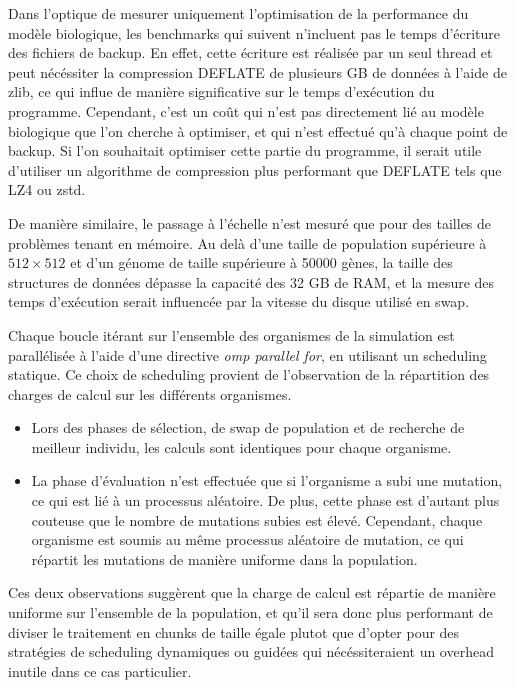 \documentclass[a4paper, 10pt, twoside]{article}
\begin{document}
Dans l'optique de mesurer uniquement l'optimisation de la performance du modèle biologique, les benchmarks qui suivent n'incluent pas le temps d'écriture des fichiers de backup. En effet, cette écriture est réalisée par un seul thread et peut nécéssiter la compression DEFLATE de plusieurs GB de données à l'aide de zlib, ce qui influe de manière significative sur le temps d'exécution du programme. Cependant, c'est un coût qui n'est pas directement lié au modèle biologique que l'on cherche à optimiser, et qui n'est effectué qu'à chaque point de backup. Si l'on souhaitait optimiser cette partie du programme, il serait utile d'utiliser un algorithme de compression plus performant que DEFLATE tels que LZ4 ou zstd.

De manière similaire, le passage à l'échelle n'est mesuré que pour des tailles de problèmes tenant en mémoire. Au delà d'une taille de population supérieure à $512 \times 512$ et d'un génome de taille supérieure à 50000 gènes, la taille des structures de données dépasse la capacité des 32 GB de RAM, et la mesure des temps d'exécution serait influencée par la vitesse du disque utilisé en swap.

Chaque boucle itérant sur l'ensemble des organismes de la simulation est parallélisée à l'aide d'une directive \textit{omp parallel for}, en utilisant un scheduling statique. Ce choix de scheduling provient de l'observation de la répartition des charges de calcul sur les différents organismes.

\begin{itemize}
	\item Lors des phases de sélection, de swap de population et de recherche de meilleur individu, les calculs sont identiques pour chaque organisme.
	\item La phase d'évaluation n'est effectuée que si l'organisme a subi une mutation, ce qui est lié à un processus aléatoire. De plus, cette phase est d'autant plus couteuse que le nombre de mutations subies est élevé. Cependant, chaque organisme est soumis au même processus aléatoire de mutation, ce qui répartit les mutations de manière uniforme dans la population.
\end{itemize}

Ces deux observations suggèrent que la charge de calcul est répartie de manière uniforme sur l'ensemble de la population, et qu'il sera donc plus performant de diviser le traitement en chunks de taille égale plutot que d'opter pour des stratégies de scheduling dynamiques ou guidées qui nécéssiteraient un overhead inutile dans ce cas particulier.
\end{document}
